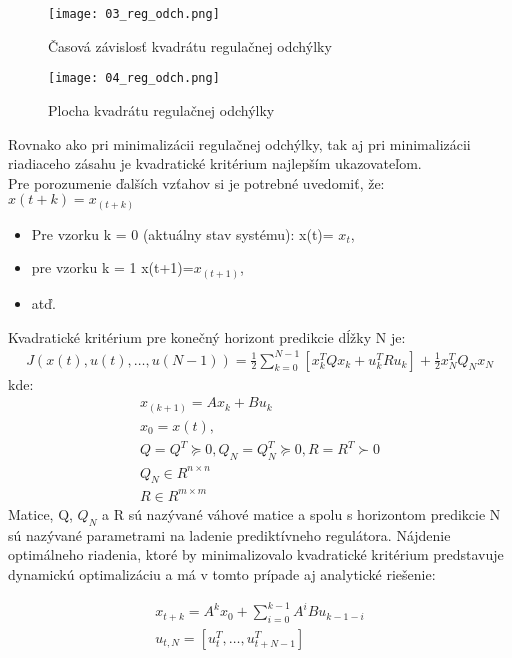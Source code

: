 \begin{figure}[!htbp]
\centering
\texttt{[image: 03\_reg\_odch.png]}
\caption{Časová závislosť kvadrátu regulačnej odchýlky}
\label{03_reg_odch}
\end{figure}
\begin{figure}[!htbp]
\centering
\texttt{[image: 04\_reg\_odch.png]}
\caption{Plocha kvadrátu regulačnej odchýlky}
\label{04_reg_odch}
\end{figure}

Rovnako ako pri minimalizácii regulačnej odchýlky, tak aj pri minimalizácii riadiaceho zásahu je kvadratické kritérium najlepším ukazovateľom. \\
Pre porozumenie ďalších vzťahov si je potrebné uvedomiť, že: $x(t+k) =x_{(t+k)}$ \\
\begin{itemize}
\item Pre vzorku k = 0 (aktuálny stav systému): x(t)= $x_t$, 
\item pre vzorku k = 1 x(t+1)=$x_{(t+1)}$, 
\item atď.
\end{itemize}
Kvadratické kritérium pre konečný horizont predikcie dĺžky N je:
\begin{equation} \label{eq3}
\begin{split}
J(x(t),u(t),…,u(N-1))=\frac{1}{2}∑_{k=0}^{N-1}[x_k^T Qx_k+u_k^T Ru_k ] +  \frac{1}{2} x_N^T Q_N x_N
\end{split}
\end{equation}
kde:
\begin{equation} \label{eq4}
\begin{split}
x_(k+1)=Ax_k+Bu_k \\
x_0=x(t), \\
Q=Q^T  \succcurlyeq 0,Q_N=Q_N^T \succcurlyeq 0,R=R^T \succ 0 \\
Q_N∈R^{n×n} \\
R∈R^{m×m}
\end{split}
\end{equation}
Matice, Q, $Q_N$ a R sú nazývané váhové matice a spolu s horizontom predikcie N sú nazývané parametrami na ladenie prediktívneho regulátora. Nájdenie optimálneho riadenia, ktoré by minimalizovalo kvadratické kritérium predstavuje dynamickú optimalizáciu a má v tomto prípade aj analytické riešenie: \cite{MPC05}

\begin{equation} \label{eq5}
\begin{split}
x_{t+k}= A^k x_0+ ∑_{i=0}^{k-1}A^i Bu_{k-1-i}\\
u_{t,N}=[u_t^T,…,u_{t+N-1}^T  ]
\end{split}
\end{equation}

